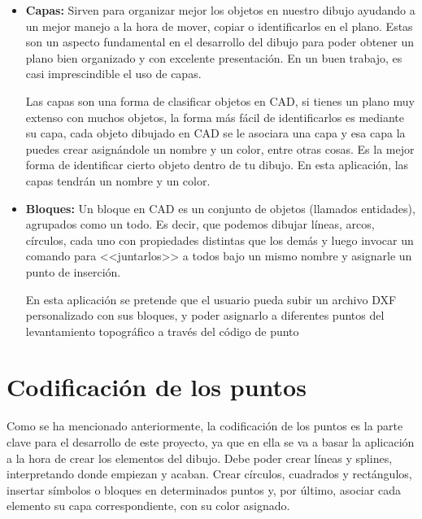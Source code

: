 \begin{itemize}

\item\textbf{Capas:} Sirven para organizar mejor los objetos en nuestro dibujo ayudando a un mejor manejo a la hora de mover, copiar o identificarlos en el plano. Estas son un aspecto fundamental en el desarrollo del dibujo para poder obtener un plano bien organizado y con excelente presentación. En un buen trabajo, es casi imprescindible el uso de capas.

Las capas son una forma de clasificar objetos en CAD, si tienes un plano muy extenso con muchos objetos, la forma más fácil de identificarlos es mediante su capa, cada objeto dibujado en CAD se le asociara una capa y esa capa la puedes crear asignándole un nombre y un color, entre otras cosas. Es la mejor forma de identificar cierto objeto dentro de tu dibujo.
En esta aplicación, las capas tendrán un nombre y un color.


\item\textbf{Bloques:} Un bloque en CAD es un conjunto de objetos (llamados entidades), agrupados como un todo. Es decir, que podemos dibujar líneas, arcos, círculos, cada uno con propiedades distintas que los demás y luego invocar un comando para <<juntarlos>> a todos bajo un mismo nombre y asignarle un punto de inserción.

En esta aplicación se pretende que el usuario pueda subir un archivo DXF personalizado con sus bloques, y poder asignarlo a diferentes puntos del levantamiento topográfico a través del código de punto

\end{itemize}

\section{Codificación de los puntos}

Como se ha mencionado anteriormente, la codificación de los puntos es la parte clave para el desarrollo de este proyecto, ya que en ella se va a basar la aplicación a la hora de crear los elementos del dibujo.
Debe poder crear líneas y splines, interpretando donde empiezan y acaban. Crear círculos, cuadrados y rectángulos, insertar símbolos o bloques en determinados puntos y, por último, asociar cada elemento su capa correspondiente, con su color asignado.

